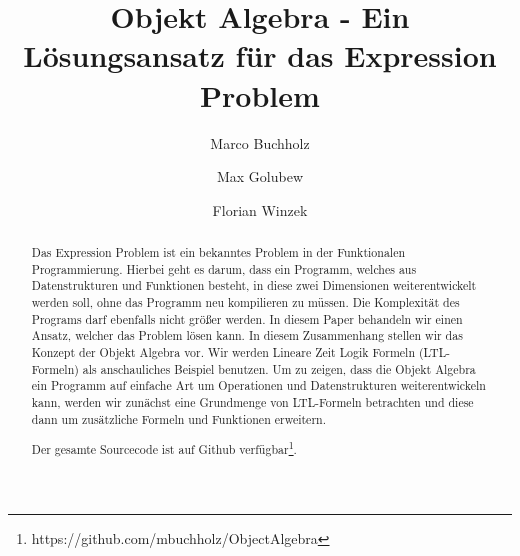 \documentclass{llncs}
\begin{document}
%
\frontmatter          %
%
\pagestyle{headings}  %
%
\mainmatter              %
%
\title{Objekt Algebra - Ein Lösungsansatz für das Expression Problem}
%
%
\author{Marco Buchholz%
\and
Max Golubew%
\and
Florian Winzek%
}
%
%
%

\maketitle              %

\begin{abstract}
Das Expression Problem ist ein bekanntes Problem in der Funktionalen Programmierung. Hierbei geht es darum, dass ein Programm, welches aus Datenstrukturen und Funktionen besteht, in diese zwei Dimensionen weiterentwickelt werden soll, ohne das Programm neu kompilieren zu müssen. Die Komplexität des Programs darf ebenfalls nicht größer werden. In diesem Paper behandeln wir einen Ansatz, welcher das Problem lösen kann. In diesem Zusammenhang stellen wir das Konzept der Objekt Algebra vor. Wir werden Lineare Zeit Logik Formeln (LTL-Formeln) als anschauliches Beispiel benutzen. Um zu zeigen, dass die Objekt Algebra ein Programm auf einfache Art um Operationen und Datenstrukturen weiterentwickeln kann, werden wir zunächst eine Grundmenge von LTL-Formeln betrachten und diese dann um zusätzliche Formeln und Funktionen erweitern.

Der gesamte Sourcecode ist auf Github verfügbar\footnote{https://github.com/mbuchholz/ObjectAlgebra}.
\end{abstract}
%
\end{document}
